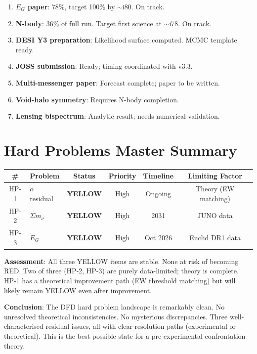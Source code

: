\documentclass[11pt,a4paper]{article}
\newcommand{\YELLOW}{\textcolor{dfdyellow}{\textbf{YELLOW}}}
\begin{document}
\begin{enumerate}[nosep]
\item \textbf{$E_G$ paper}: 78\%, target 100\% by $\sim$i80. On track.
\item \textbf{N-body}: 36\% of full run. Target first science at $\sim$i78. On track.
\item \textbf{DESI Y3 preparation}: Likelihood surface computed. MCMC template ready.
\item \textbf{JOSS submission}: Ready; timing coordinated with v3.3.
\item \textbf{Multi-messenger paper}: Forecast complete; paper to be written.
\item \textbf{Void-halo symmetry}: Requires N-body completion.
\item \textbf{Lensing bispectrum}: Analytic result; needs numerical validation.
\end{enumerate}

\section{Hard Problems Master Summary}

\begin{center}
\begin{tabular}{clcccc}
\toprule
\textbf{\#} & \textbf{Problem} & \textbf{Status} & \textbf{Priority} & \textbf{Timeline} & \textbf{Limiting Factor} \\
\midrule
HP-1 & $\alpha$ residual & \YELLOW & High & Ongoing & Theory (EW matching) \\
HP-2 & $\Sigma m_\nu$ & \YELLOW & High & 2031 & JUNO data \\
HP-3 & $E_G$ & \YELLOW & High & Oct 2026 & Euclid DR1 data \\
\bottomrule
\end{tabular}
\end{center}

\textbf{Assessment}: All three YELLOW items are stable. None at risk of becoming RED. Two of three (HP-2, HP-3) are purely data-limited; theory is complete. HP-1 has a theoretical improvement path (EW threshold matching) but will likely remain YELLOW even after improvement.

\textbf{Conclusion}: The DFD hard problem landscape is remarkably clean. No unresolved theoretical inconsistencies. No mysterious discrepancies. Three well-characterised residual issues, all with clear resolution paths (experimental or theoretical). This is the best possible state for a pre-experimental-confrontation theory.
\end{document}
